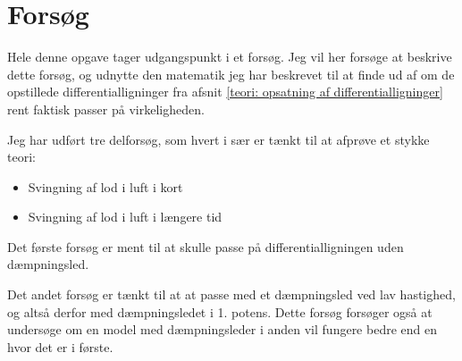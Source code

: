 \chapter{Forsøg}
Hele denne opgave tager udgangspunkt i et forsøg.
Jeg vil her forsøge at beskrive dette forsøg, og udnytte den matematik jeg har beskrevet til at finde ud af om de opstillede differentialligninger fra afsnit \ref{teori: opsatning af differentialligninger} rent faktisk passer på virkeligheden.

Jeg har udført tre delforsøg, som hvert i sær er tænkt til at afprøve et stykke teori:
\begin{itemize}
	\item Svingning af lod i luft i kort
	\item Svingning af lod i luft i længere tid
\end{itemize}

Det første forsøg er ment til at skulle passe på differentialligningen uden dæmpningsled.

Det andet forsøg er tænkt til at at passe med et dæmpningsled ved lav hastighed, og altså derfor med dæmpningsledet i 1. potens.
Dette forsøg forsøger også at undersøge om en model med dæmpningsleder i anden vil fungere bedre end en hvor det er i første. 
